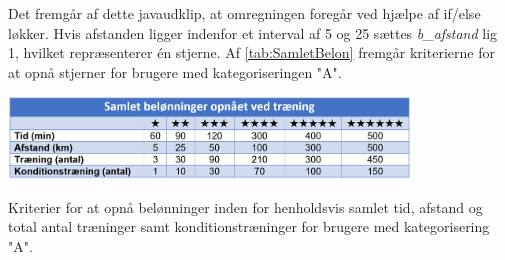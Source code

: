 \noindent
Det fremgår af dette javaudklip, at omregningen foregår ved hjælpe af if/else løkker. Hvis afstanden ligger indenfor et interval af 5 og 25 sættes \textit{b\_afstand} lig 1, hvilket repræsenterer én stjerne. Af \autoref{tab:SamletBelon} fremgår kriterierne for at opnå stjerner for brugere med kategoriseringen "A".  

\begin{table}[H]
\centering
\includegraphics[width=0.8\textwidth]{figures/imple/SamletBelon}
\caption{Kriterier for at opnå belønninger inden for henholdsvis samlet tid, afstand og total antal træninger samt konditionstræninger for brugere med kategorisering "A".}
\label{tab:SamletBelon}
\end{table}  

